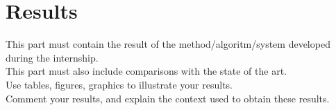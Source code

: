 \chapter{Results}


This part must contain the result of the method/algoritm/system developed during the internship. \\

This part must also include comparisons with the state of the art.\\

Use tables, figures, graphics to illustrate your results. \\ 

Comment your results, and explain the context used to obtain these results.




